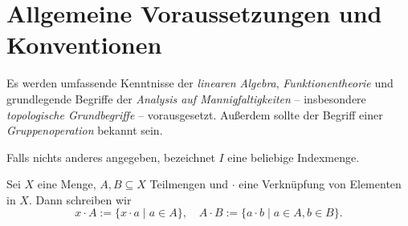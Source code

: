 \setcounter{section}{-1}
\section{Allgemeine Voraussetzungen und Konventionen}

Es werden umfassende Kenntnisse der 
\emph{linearen Algebra},
\emph{Funktionentheorie} und grundlegende Begriffe der \emph{Analysis auf Mannigfaltigkeiten} -- insbesondere \emph{topologische Grundbegriffe} -- vorausgesetzt. Außerdem sollte der Begriff einer \emph{Gruppenoperation} bekannt sein. 
\begin{notation}[Indexmenge]
    Falls nichts anderes angegeben, bezeichnet \(I\) eine beliebige Indexmenge.
\end{notation}
\begin{notation}
	Sei \(X\) eine Menge, \(A,B\subseteq X\) Teilmengen und \(\cdot\) eine Verknüpfung von Elementen in \(X\). Dann schreiben wir
	\[x\cdot A := \{x\cdot a\mid a\in A\}, \quad A\cdot B := \{a\cdot b \mid a\in A, b\in B\}.\]
\end{notation}

\pagebreak
